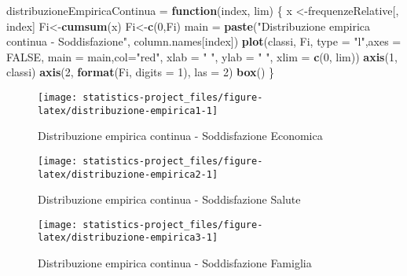 \documentclass[]{book}
\newenvironment{Shaded}{\begin{snugshade}}{\end{snugshade}}
\newcommand{\KeywordTok}[1]{\textcolor[rgb]{0.13,0.29,0.53}{\textbf{#1}}}
\newcommand{\DataTypeTok}[1]{\textcolor[rgb]{0.13,0.29,0.53}{#1}}
\newcommand{\DecValTok}[1]{\textcolor[rgb]{0.00,0.00,0.81}{#1}}
\newcommand{\StringTok}[1]{\textcolor[rgb]{0.31,0.60,0.02}{#1}}
\newcommand{\OtherTok}[1]{\textcolor[rgb]{0.56,0.35,0.01}{#1}}
\newcommand{\ControlFlowTok}[1]{\textcolor[rgb]{0.13,0.29,0.53}{\textbf{#1}}}
\newcommand{\NormalTok}[1]{#1}
\begin{document}
\begin{Shaded}
\begin{Highlighting}[]
\NormalTok{distribuzioneEmpiricaContinua =}\StringTok{ }\ControlFlowTok{function}\NormalTok{(index, lim) \{}
\NormalTok{  x <-frequenzeRelative[, index]}
\NormalTok{  Fi<-}\KeywordTok{cumsum}\NormalTok{(x)}
\NormalTok{  Fi<-}\KeywordTok{c}\NormalTok{(}\DecValTok{0}\NormalTok{,Fi)}
\NormalTok{  main =}\StringTok{ }\KeywordTok{paste}\NormalTok{(}\StringTok{"Distribuzione empirica continua - Soddisfazione"}\NormalTok{, column.names[index])}
  \KeywordTok{plot}\NormalTok{(classi, Fi, }\DataTypeTok{type =} \StringTok{"l"}\NormalTok{,}\DataTypeTok{axes =} \OtherTok{FALSE}\NormalTok{, }
       \DataTypeTok{main =}\NormalTok{ main,}\DataTypeTok{col=}\StringTok{"red"}\NormalTok{, }
       \DataTypeTok{xlab =} \StringTok{" "}\NormalTok{, }\DataTypeTok{ylab =} \StringTok{" "}\NormalTok{,}
       \DataTypeTok{xlim =} \KeywordTok{c}\NormalTok{(}\DecValTok{0}\NormalTok{, lim))}
  \KeywordTok{axis}\NormalTok{(}\DecValTok{1}\NormalTok{, classi)}
  \KeywordTok{axis}\NormalTok{(}\DecValTok{2}\NormalTok{, }\KeywordTok{format}\NormalTok{(Fi, }\DataTypeTok{digits =} \DecValTok{1}\NormalTok{), }\DataTypeTok{las =} \DecValTok{2}\NormalTok{)}
  \KeywordTok{box}\NormalTok{()}
\NormalTok{\}}
\end{Highlighting}
\end{Shaded}

\begin{figure}

{\centering \texttt{[image: statistics-project\_files/figure-latex/distribuzione-empirica1-1]} 

}

\caption{Distribuzione empirica continua - Soddisfazione Economica}\label{fig:distribuzione-empirica1}
\end{figure}

\begin{figure}

{\centering \texttt{[image: statistics-project\_files/figure-latex/distribuzione-empirica2-1]} 

}

\caption{Distribuzione empirica continua - Soddisfazione Salute}\label{fig:distribuzione-empirica2}
\end{figure}

\begin{figure}

{\centering \texttt{[image: statistics-project\_files/figure-latex/distribuzione-empirica3-1]} 

}

\caption{Distribuzione empirica continua - Soddisfazione Famiglia}\label{fig:distribuzione-empirica3}
\end{figure}
\end{document}
